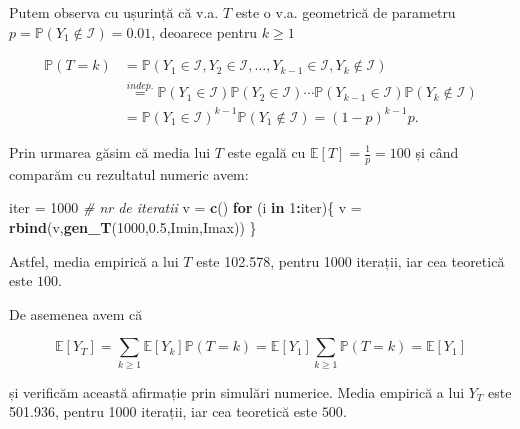 \documentclass[]{article}
\newenvironment{Shaded}{\begin{snugshade}}{\end{snugshade}}
\newcommand{\KeywordTok}[1]{\textcolor[rgb]{0.13,0.29,0.53}{\textbf{#1}}}
\newcommand{\DecValTok}[1]{\textcolor[rgb]{0.00,0.00,0.81}{#1}}
\newcommand{\FloatTok}[1]{\textcolor[rgb]{0.00,0.00,0.81}{#1}}
\newcommand{\StringTok}[1]{\textcolor[rgb]{0.31,0.60,0.02}{#1}}
\newcommand{\CommentTok}[1]{\textcolor[rgb]{0.56,0.35,0.01}{\textit{#1}}}
\newcommand{\ControlFlowTok}[1]{\textcolor[rgb]{0.13,0.29,0.53}{\textbf{#1}}}
\newcommand{\OperatorTok}[1]{\textcolor[rgb]{0.81,0.36,0.00}{\textbf{#1}}}
\newcommand{\NormalTok}[1]{#1}
\begin{document}
Putem observa cu ușurință că v.a. \(T\) este o v.a. geometrică de
parametru \(p=\mathbb{P}(Y_1\not\in\mathcal{I})=0.01\), deoarece pentru
\(k\geq1\)

\[
\begin{aligned}
  \mathbb{P}(T=k) &= \mathbb{P}(Y_1\in\mathcal{I},Y_2\in\mathcal{I},\dots,Y_{k-1}\in\mathcal{I},Y_k\not\in\mathcal{I})\\
                  &\overset{indep.}{=} \mathbb{P}(Y_1\in\mathcal{I})\mathbb{P}(Y_2\in\mathcal{I})\cdots\mathbb{P}(Y_{k-1}\in\mathcal{I})\mathbb{P}(Y_k\not\in\mathcal{I})\\
                  &= \mathbb{P}(Y_1\in\mathcal{I})^{k-1}\mathbb{P}(Y_1\not\in\mathcal{I}) = (1-p)^{k-1}p.
\end{aligned}
\]

Prin urmarea găsim că media lui \(T\) este egală cu
\(\mathbb{E}[T]=\frac{1}{p}=100\) și când comparăm cu rezultatul numeric
avem:

\begin{Shaded}
\begin{Highlighting}[]
\NormalTok{iter =}\StringTok{ }\DecValTok{1000} \CommentTok{# nr de iteratii}
\NormalTok{v =}\StringTok{ }\KeywordTok{c}\NormalTok{()}
\ControlFlowTok{for}\NormalTok{ (i }\ControlFlowTok{in} \DecValTok{1}\OperatorTok{:}\NormalTok{iter)\{}
\NormalTok{  v =}\StringTok{ }\KeywordTok{rbind}\NormalTok{(v,}\KeywordTok{gen_T}\NormalTok{(}\DecValTok{1000}\NormalTok{,}\FloatTok{0.5}\NormalTok{,Imin,Imax))}
\NormalTok{\}}
\end{Highlighting}
\end{Shaded}

Astfel, media empirică a lui \(T\) este 102.578, pentru 1000 iterații,
iar cea teoretică este \(100\).

De asemenea avem că

\[
\mathbb{E}[Y_T] = \sum_{k\geq1}\mathbb{E}[Y_k]\mathbb{P}(T=k) = \mathbb{E}[Y_1]\sum_{k\geq1}\mathbb{P}(T=k) = \mathbb{E}[Y_1]
\]

și verificăm această afirmație prin simulări numerice. Media empirică a
lui \(Y_T\) este 501.936, pentru 1000 iterații, iar cea teoretică este
\(500\).
\end{document}

